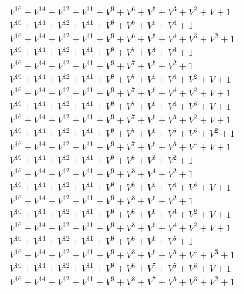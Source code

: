 \documentclass[12pt]{article}
\begin{document}
\begin{adjustwidth}{-4cm}{}
\begin{center}
\begin{longtable}{|l|}
$V^{16}  +V^{14}  +V^{12}  +V^{11}  +V^{9}  +V^{6}  +V^{5}  +V^{3}  +V^{2}  + V + 1$ \\
$V^{16}  +V^{14}  +V^{12}  +V^{11}  +V^{9}  +V^{6}  +V^{5}  +V^{4}  + 1$ \\
$V^{16}  +V^{14}  +V^{12}  +V^{11}  +V^{9}  +V^{6}  +V^{5}  +V^{4}  +V^{3}  +V^{2}  + 1$ \\
$V^{16}  +V^{14}  +V^{12}  +V^{11}  +V^{9}  +V^{7}  +V^{4}  +V^{3}  + 1$ \\
$V^{16}  +V^{14}  +V^{12}  +V^{11}  +V^{9}  +V^{7}  +V^{5}  +V^{2}  + 1$ \\
$V^{16}  +V^{14}  +V^{12}  +V^{11}  +V^{9}  +V^{7}  +V^{5}  +V^{4}  +V^{2}  + V + 1$ \\
$V^{16}  +V^{14}  +V^{12}  +V^{11}  +V^{9}  +V^{7}  +V^{6}  +V^{4}  +V^{2}  + V + 1$ \\
$V^{16}  +V^{14}  +V^{12}  +V^{11}  +V^{9}  +V^{7}  +V^{6}  +V^{4}  +V^{3}  + V + 1$ \\
$V^{16}  +V^{14}  +V^{12}  +V^{11}  +V^{9}  +V^{7}  +V^{6}  +V^{5}  +V^{2}  + V + 1$ \\
$V^{16}  +V^{14}  +V^{12}  +V^{11}  +V^{9}  +V^{7}  +V^{6}  +V^{5}  +V^{3}  +V^{2}  + 1$ \\
$V^{16}  +V^{14}  +V^{12}  +V^{11}  +V^{9}  +V^{7}  +V^{6}  +V^{5}  +V^{4}  + V + 1$ \\
$V^{16}  +V^{14}  +V^{12}  +V^{11}  +V^{9}  +V^{8}  +V^{3}  +V^{2}  + 1$ \\
$V^{16}  +V^{14}  +V^{12}  +V^{11}  +V^{9}  +V^{8}  +V^{4}  +V^{2}  + 1$ \\
$V^{16}  +V^{14}  +V^{12}  +V^{11}  +V^{9}  +V^{8}  +V^{5}  +V^{4}  +V^{3}  + V + 1$ \\
$V^{16}  +V^{14}  +V^{12}  +V^{11}  +V^{9}  +V^{8}  +V^{6}  +V^{2}  + 1$ \\
$V^{16}  +V^{14}  +V^{12}  +V^{11}  +V^{9}  +V^{8}  +V^{6}  +V^{3}  +V^{2}  + V + 1$ \\
$V^{16}  +V^{14}  +V^{12}  +V^{11}  +V^{9}  +V^{8}  +V^{6}  +V^{4}  +V^{2}  + V + 1$ \\
$V^{16}  +V^{14}  +V^{12}  +V^{11}  +V^{9}  +V^{8}  +V^{6}  +V^{5}  + 1$ \\
$V^{16}  +V^{14}  +V^{12}  +V^{11}  +V^{9}  +V^{8}  +V^{6}  +V^{5}  +V^{4}  +V^{3}  + 1$ \\
$V^{16}  +V^{14}  +V^{12}  +V^{11}  +V^{9}  +V^{8}  +V^{7}  +V^{5}  +V^{3}  + V + 1$ \\
$V^{16}  +V^{14}  +V^{12}  +V^{11}  +V^{9}  +V^{8}  +V^{7}  +V^{5}  +V^{3}  +V^{2}  + 1$ \\

\end{longtable}
\end{center}
\end{adjustwidth}
\end{document}
